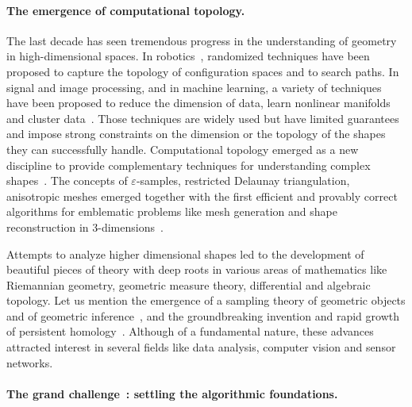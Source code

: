 \paragraph{The emergence of computational topology.}
The last decade has seen tremendous progress in  the understanding of geometry in high-dimensional spaces. In robotics~\cite{sml-pa-2006}, randomized techniques have been proposed to capture the topology of configuration spaces and to search paths. In signal and image processing, and in machine learning, a variety of techniques have been proposed to reduce the dimension of data, learn nonlinear manifolds and cluster data~\cite{hs-fmmds-2006}. %
Those techniques are widely used but have limited guarantees and 
impose strong constraints on the dimension or the topology of the shapes they can successfully handle. Computational topology emerged as a new discipline  to 
provide complementary techniques for understanding complex shapes~\cite{hh-ct-2010}. 
The concepts of $\varepsilon$-samples, restricted Delaunay triangulation, anisotropic meshes emerged together with the first efficient and provably correct algorithms for emblematic problems like mesh generation and shape reconstruction in 3-dimensions~\cite{geometrica-ecg-book}. 

Attempts to analyze higher dimensional shapes led to the development of beautiful pieces of theory with deep roots in various areas of mathematics like Riemannian geometry, geometric measure theory, differential and algebraic topology. Let us mention  the emergence of a sampling theory of geometric objects and of geometric inference~\cite{geometrica-ccl09}, and the groundbreaking invention and rapid growth of persistent homology~\cite{eh-ph-2008}.
Although of a fundamental nature, these advances 
attracted  interest in several fields like data analysis, computer vision and sensor networks.

\paragraph{The grand challenge~: settling the algorithmic foundations.}


